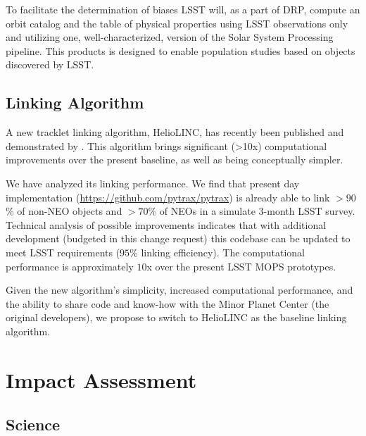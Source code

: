 \documentclass[DM,authoryear,toc,lsstdraft]{lsstdoc}
\begin{document}
To facilitate the determination of biases LSST will, as a part of DRP, compute an orbit catalog and the table of physical properties using LSST observations only and utilizing one, well-characterized, version of the Solar System Processing pipeline. This products is designed to enable population studies based on objects discovered by LSST.

\subsection{Linking Algorithm}

A new tracklet linking algorithm, HelioLINC, has recently been published and demonstrated by \cite{2018AJ....156..135H}. This algorithm brings significant (>10x) computational improvements over the present baseline, as well as being conceptually simpler.

We have analyzed its linking performance. We find that present day implementation (\url{https://github.com/pytrax/pytrax}) is already able to link $> 90$\% of non-NEO objects and $> 70$\% of NEOs in a simulate 3-month LSST survey. Technical analysis of possible improvements indicates that with additional development (budgeted in this change request) this codebase can be updated to meet LSST requirements ($95$\% linking efficiency). The computational performance is approximately $10$x over the present LSST MOPS prototypes.

Given the new algorithm's simplicity, increased computational performance, and the ability to share code and know-how with the Minor Planet Center (the original developers), we propose to switch to HelioLINC as the baseline linking algorithm.

\section{Impact Assessment}

\subsection{Science}
\end{document}
